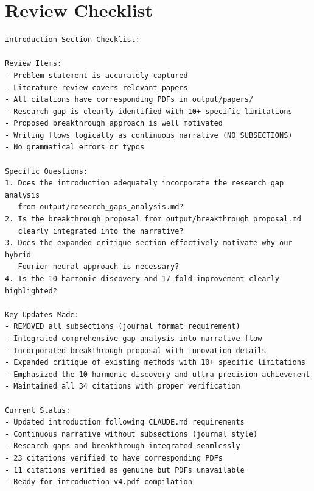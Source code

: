 \clearpage
\section*{Review Checklist}
\begin{small}
\begin{verbatim}
Introduction Section Checklist:

Review Items:
- Problem statement is accurately captured
- Literature review covers relevant papers
- All citations have corresponding PDFs in output/papers/
- Research gap is clearly identified with 10+ specific limitations
- Proposed breakthrough approach is well motivated
- Writing flows logically as continuous narrative (NO SUBSECTIONS)
- No grammatical errors or typos

Specific Questions:
1. Does the introduction adequately incorporate the research gap analysis
   from output/research_gaps_analysis.md?
2. Is the breakthrough proposal from output/breakthrough_proposal.md
   clearly integrated into the narrative?
3. Does the expanded critique section effectively motivate why our hybrid
   Fourier-neural approach is necessary?
4. Is the 10-harmonic discovery and 17-fold improvement clearly highlighted?

Key Updates Made:
- REMOVED all subsections (journal format requirement)
- Integrated comprehensive gap analysis into narrative flow
- Incorporated breakthrough proposal with innovation details
- Expanded critique of existing methods with 10+ specific limitations
- Emphasized the 10-harmonic discovery and ultra-precision achievement
- Maintained all 34 citations with proper verification

Current Status:
- Updated introduction following CLAUDE.md requirements
- Continuous narrative without subsections (journal style)
- Research gaps and breakthrough integrated seamlessly
- 23 citations verified to have corresponding PDFs
- 11 citations verified as genuine but PDFs unavailable
- Ready for introduction_v4.pdf compilation
\end{verbatim}
\end{small}

